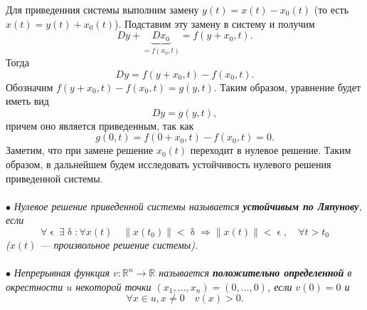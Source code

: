 \documentclass[a4paper, 12pt]{report}
\newcommand{\Rm}{\mathbb{R}}
\renewcommand{\delta}{\updelta}
\renewcommand{\epsilon}{\upvarepsilon}
\newcommand\Norm[1]{\left\| #1 \right\|}
\begin{document}
	Для приведенния системы выполним замену $y(t) = x(t) - x_0(t)$ (то есть $x(t) = y(t) + x_0(t)$). Подставим эту замену в систему и получим $$Dy + \underbrace{Dx_0}_{=f(x_0, t)} = f(y + x_0, t).$$
	Тогда $$Dy = f(y+x_0, t) - f(x_0,t).$$
	Обозначим $f(y+x_0, t) - f(x_0,t) = g(y,t)$. Таким образом, уравнение будет иметь вид $$Dy = g(y,t),$$
	причем оно является приведенным, так как $$g(0,t) = f(0+x_0,t) - f(x_0,t) = 0.$$
	Заметим, что при замене решение $x_0(t)$ переходит в нулевое решение. Таким образом, в дальнейшем будем исследовать устойчивость нулевого решения приведенной системы.\\\\
	$\bullet$ \textit{Нулевое решение приведенной системы называется \textbf{устойчивым по Ляпунову}, если} $$\forall \epsilon\ \exists \delta : \forall x(t)\quad \Norm{x(t_0)} < \delta \Rightarrow \Norm{x(t)} < \epsilon,\quad \forall t > t_0$$
	\textit{($x(t)$ --- произвольное решение системы).}\\\\
	$\bullet$ \textit{Непрерывная функция $v : \Rm^n \rightarrow \Rm$ называется \textbf{положительно определенной} в окрестности $u$ некоторой точки $(x_1,\ldots, x_n) = (0,\ldots, 0)$, если $v(0) = 0$ и} $$\forall x \in u, x \ne 0\quad v(x) > 0.$$
\end{document}

